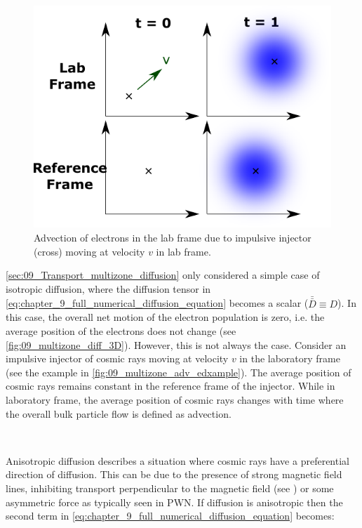 \begin{figure}
    \centering
    \includegraphics{09_Multizone/Images/advection/adv_example.pdf}
    \caption{Advection of electrons in the lab frame due to impulsive injector (cross) moving at velocity $v$ in lab frame.}
    \label{fig:09_multizone_adv_edxample}
\end{figure}

\autoref{sec:09_Transport_multizone_diffusion} only considered a simple case of isotropic diffusion, where the diffusion tensor in \autoref{eq:chapter_9_full_numerical_diffusion_equation} becomes a scalar ($\bar{\bar{D}}\equiv D$). In this case, the overall net motion of the electron population is zero, i.e. the average position of the electrons does not change (see \autoref{fig:09_multizone_diff_3D}). However, this is not always the case. Consider an impulsive injector of cosmic rays moving at velocity $v$ in the laboratory frame (see the example in \autoref{fig:09_multizone_adv_edxample}). The average position of cosmic rays remains constant in the reference frame of the injector. While in laboratory frame, the average position of cosmic rays changes with time where the overall bulk particle flow is defined as advection.
\par~\par
Anisotropic diffusion describes a situation where cosmic rays have a preferential direction of diffusion. This can be due to the presence of strong magnetic field lines, inhibiting transport perpendicular to the magnetic field (see \cite{2013ApJ...768...73M,2013MNRAS.429.1643N,2023arXiv230402684L}) or some asymmetric force as typically seen in PWN. If diffusion is anisotropic then the second term in \autoref{eq:chapter_9_full_numerical_diffusion_equation} becomes:

